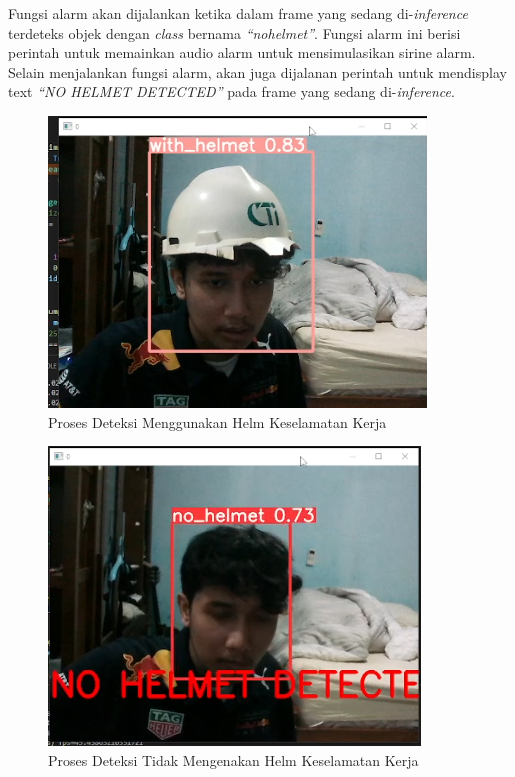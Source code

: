 

Fungsi alarm akan dijalankan ketika dalam frame yang sedang di-\emph{inference} terdeteks objek dengan \emph{class} bernama \emph{“no\textunderscore helmet”}. Fungsi alarm ini berisi perintah untuk memainkan audio alarm untuk mensimulasikan sirine alarm. Selain menjalankan fungsi alarm, akan juga dijalanan perintah untuk mendisplay text \emph{“NO HELMET DETECTED”} pada frame yang sedang di-\emph{inference}.

\begin{figure}[ht]
  \centering
  \includegraphics[scale=1]{gambar/Screenshot_90.png}
  \caption{Proses Deteksi Menggunakan Helm Keselamatan Kerja}
  \label{fig:deteksiwthhelm}  
\end{figure}

\begin{figure}[ht]
  \centering
  \includegraphics[scale=1]{gambar/Screenshot_91.png}
  \caption{Proses Deteksi Tidak Mengenakan Helm Keselamatan Kerja}
  \label{fig:deteksinohelm}  
\end{figure}

